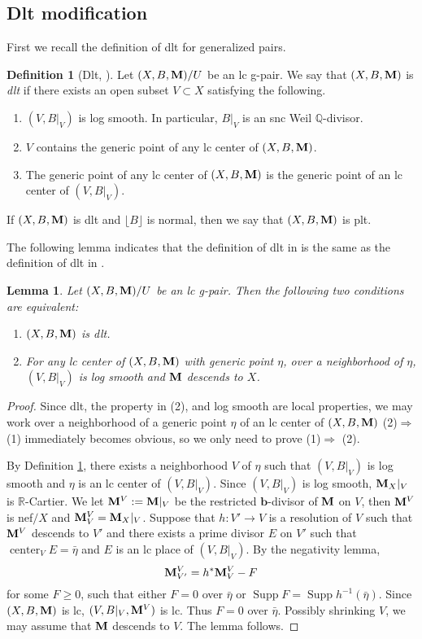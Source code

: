 \documentclass[11pt]{amsart}
\numberwithin{equation}{section}
\newcommand{\bb}{\bm{b}}
\newcommand{\Mm}{{\bf{M}}}
\newcommand{\Qq}{\mathbb{Q}}
\newcommand{\Rr}{\mathbb{R}}
\newcommand{\Center}{\operatorname{center}}
\newcommand{\Supp}{\operatorname{Supp}}
\newtheorem{lem}[thm]{Lemma}
\theoremstyle{definition}
\newtheorem{defn}[thm]{Definition}
\theoremstyle{definition}
\theoremstyle{definition}
\begin{document}
\subsection{Dlt modification}

First we recall the definition of dlt for generalized pairs.

\begin{defn}[Dlt, {\cite[Definition 2.3]{HL22}}]\label{defn: dlt}
Let $(X,B,\Mm)/U$ be an lc g-pair. We say that $(X,B,\Mm)$ is \emph{dlt} if there exists an open subset $V\subset X$ satisfying the following.
\begin{enumerate}
    \item $(V,B|_V)$ is log smooth. In particular, $B|_V$ is an snc Weil $\Qq$-divisor.
    \item $V$ contains the generic point of any lc center of $(X,B,\Mm)$.
    \item The generic point of any lc center of $(X,B,\Mm)$ is the generic point of an lc center of $(V,B|_V)$.
\end{enumerate}
If $(X,B,\Mm)$ is dlt and $\lfloor B\rfloor$ is normal, then we say that $(X,B,\Mm)$ is plt.
\end{defn}

The following lemma indicates that the definition of dlt in \cite[Definition 2.3]{HL22} is the same as the definition of dlt in \cite{Bir20,FS23}. 
\begin{lem}\label{lem: equi def dlt 1}
Let $(X,B,\Mm)/U$ be an lc g-pair. Then the following two conditions are equivalent: 
\begin{enumerate}
    \item $(X,B,\Mm)$ is dlt.
    \item For any lc center of $(X,B,\Mm)$ with generic point $\eta$, over a neighborhood of $\eta$, $(V,B|_V)$ is log smooth and $\Mm$ descends to $X$. 
\end{enumerate} 
\end{lem}
\begin{proof}
Since dlt, the property in (2), and log smooth are local properties, we may work over a neighborhood of a generic point $\eta$ of an lc center of $(X,B,\Mm)$ (2)$\Rightarrow$ (1) immediately becomes obvious, so we only need to prove (1)$\Rightarrow$ (2). 

By Definition \ref{defn: dlt}, there exists a neighborhood $V$ of $\eta$ such that $(V,B|_V)$ is log smooth and $\eta$ is an lc center of $(V,B|_V)$. Since $(V,B|_V)$ is log smooth, $\Mm_X|_V$ is $\Rr$-Cartier. We let $\Mm^V:=\Mm|_V$ be the restricted $\bb$-divisor of $\Mm$ on $V$, then $\Mm^V$ is nef$/X$ and $\Mm^V_V=\Mm_X|_V$. Suppose that $h: V'\rightarrow V$ is a resolution of $V$ such that $\Mm^V$ descends to $V'$ and there exists a prime divisor $E$ on $V'$ such that $\Center_{V}E=\bar\eta$ and $E$ is an lc place of $(V,B|_V)$. By the negativity lemma,
    $$\Mm^V_{V'}=h^*\Mm^V_V-F$$
    for some $F\geq 0$, such that either $F=0$ over $\bar\eta$ or $\Supp F=\Supp h^{-1}(\bar\eta)$. Since $(X,B,\Mm)$ is lc, $(V,B|_V,\Mm^V)$ is lc. Thus $F=0$ over $\bar\eta$. Possibly shrinking $V$, we may assume that $\Mm$ descends to $V$. The lemma follows.
\end{proof}
\end{document}
